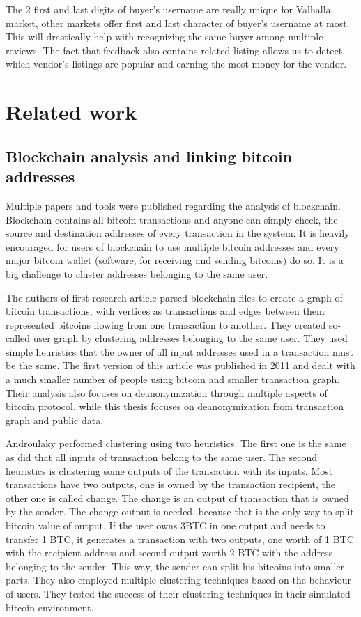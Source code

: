 \documentclass[
  digital, %
  table,   %
  lof,     %
  lot,     %
  oneside
]{fithesis3}
\begin{document}
The 2 first and last digits of buyer's username are really unique for Valhalla market,
other markets offer first and last character of buyer's username at most.
This will drastically help with recognizing the same buyer among multiple reviews.
The fact that feedback also contains related listing allows us to
detect, which vendor's listings are popular and earning the most money for the vendor.

\chapter{Related work}
\section{Blockchain analysis and linking bitcoin addresses}

Multiple papers and tools were published regarding the analysis of blockchain.
Blockchain contains all bitcoin transactions and anyone can simply check,
the source and destination addresses of every transaction in the system.
It is heavily encouraged for users of blockchain to use multiple bitcoin addresses
 and every major bitcoin wallet (software, for receiving and sending bitcoins) do so.
 It is a big challenge to cluster addresses belonging to the same user.
 
The authors of first research article \parencite{reid2013analysis}
 parsed blockchain files to create a graph of bitcoin transactions, with vertices as transactions
 and edges between them represented bitcoins flowing from one transaction to another.
 They created so-called user graph by clustering addresses belonging to the same user.
 They used simple heuristics that the owner of all input addresses used in a transaction must be the same. The first version of this article  
was published in 2011 and dealt with a much smaller number of people using bitcoin and smaller transaction graph.
Their analysis also focuses on deanonymization through multiple aspects of bitcoin protocol,
while this thesis focuses on deanonymization from transaction graph and public data.

Androulaky \parencite{androulaki2013evaluating} performed clustering using two heuristics.
The first one is the same as \parencite{reid2013analysis} did that all inputs of transaction
belong to the same user. The second heuristics is clustering some outputs of the transaction with its inputs.
Most transactions have two outputs, one is owned by the transaction recipient,
the other one is called change. The change is an output of transaction that is owned by
the sender. The change output is needed, because that is the only way to split bitcoin value of output.
 If the user owns 3BTC in one output and needs to transfer 1 BTC, it generates a transaction with two outputs, one worth of 1 BTC with the recipient address and second output worth 2 BTC 
 with the address belonging to the sender. This way, the sender can split his bitcoins into smaller parts.
 They also employed multiple clustering techniques based on the behaviour of users.
 They tested the success of their clustering techniques in their simulated bitcoin 
 environment.
\end{document}
